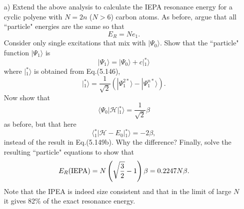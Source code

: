 \documentclass[a4paper]{book}
\begin{document}
	\begin{exercise}
	\begin{enumerate}
	
	\item[a)] Extend the above analysis to calculate the IEPA resonance energy for a cyclic polyene with $N=2n$ ($N>6$) carbon atoms. As before, argue that all ``particle" energies are the same so that
	\[
		E_R = N e_1.
	\]
	Consider only single excitations that mix with $| \Psi_0 \rangle$. Show that the ``particle" function $| \Psi_1 \rangle$ is
	\[
		| \Psi_1 \rangle = | \Psi_0 \rangle + c | {}^*_1 \rangle
	\]
	where $| {}^{*}_1 \rangle$ is obtained from Eq.(5.146),
	\[
		| {}^*_1 \rangle = \frac{1}{\sqrt{2}} \left( | \Psi^{2*}_1 \rangle - | \Psi^{n*}_1 \rangle \right).
	\]
	Now show that
	\[
		\langle \Psi_0 | \mathscr{H} | {}^*_1 \rangle = \frac{1}{\sqrt{2}} \beta
	\]
	as before, but that here
	\[
		\langle {}^*_1 | \mathscr{H} - E_0 | {}^*_1 \rangle = -2 \beta,
	\]
	instead of the result in Eq.(5.149b). Why the difference? Finally, solve the resulting ``particle" equations to show that
	\[
		E_R({\rm IEPA}) = N\left( \sqrt{ \frac{3}{2} } -1 \right) \beta = 0.2247 N \beta.
	\]
	Note that the IPEA is indeed size consistent and that in the limit of large $N$ it gives 82\% of the exact resonance energy.
	

\end{enumerate}
\end{exercise}
\end{document}
